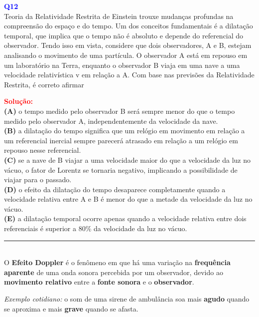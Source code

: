 \documentclass[a4paper,12pt]{article}
\begin{document}
\begin{flushleft}
\textbf{\textcolor{blue}{\Large Q12}}\\
\colorbox{yellow!50}{Teoria da Relatividade Restrita de Einstein} trouxe mudanças profundas na compreensão
do espaço e do tempo. Um dos conceitos fundamentais é a dilatação temporal, que implica
que o tempo não é absoluto e depende do referencial do observador. Tendo isso em vista, considere que dois
observadores, A e B, estejam analisando o movimento de uma partícula. O observador A está em repouso em um 
laboratório na Terra, enquanto o observador B viaja em uma nave a uma velocidade relativística v em relação
 a A. Com base nas previsões da Relatividade Restrita, é correto afirmar 

\textcolor{red}{\textbf{Solução:}}\\

\textbf{(A)} o tempo medido pelo observador B será sempre
menor do que o tempo medido pelo observador
A, independentemente da velocidade da nave.\\
\colorbox{green!50}{\textbf{(B)}} a dilatação do tempo significa que um relógio em
movimento em relação a um referencial inercial
sempre parecerá atrasado em relação a um
relógio em repouso nesse referencial.\\
\textbf{(C)} se a nave de B viajar a uma velocidade maior do
que a velocidade da luz no vácuo, o fator de
Lorentz se tornaria negativo, implicando a
possibilidade de viajar para o passado.\\
\textbf{(D)} o efeito da dilatação do tempo desaparece
completamente quando a velocidade relativa
entre A e B é menor do que a metade da
velocidade da luz no vácuo.\\
\textbf{(E)} a dilatação temporal ocorre apenas quando a
velocidade relativa entre dois referenciais é
superior a 80\% da velocidade da luz no vácuo.

\end{flushleft}

\noindent\rule{\linewidth}{0.6pt}\\

O \textbf{Efeito Doppler} é o fenômeno em que há uma variação na \textbf{frequência aparente} de uma onda sonora percebida por um observador, devido ao \textbf{movimento relativo} entre a \textbf{fonte sonora} e o \textbf{observador}.

\bigskip

\textit{Exemplo cotidiano:} o som de uma sirene de ambulância soa mais \textbf{agudo} quando se aproxima e mais \textbf{grave} quando se afasta.
\end{document}
